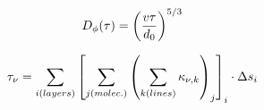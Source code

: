 \documentclass[20]{article}
\begin{document}
\begin{equation}
\huge D_{\phi}(\tau)= \left( \dfrac{v \tau}{d_0}\right)^{5/3} 
\end{equation}


\begin{equation}
\huge \tau_\nu = \sum_{i(layers)} \left[ \sum_{j(molec.)} \left( \sum_{k(lines)} \kappa_{\nu, k} \right)_j \right]_i \cdot \Delta s_i
\end{equation}
\end{document}
